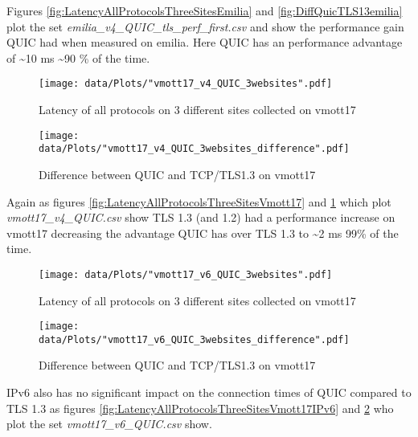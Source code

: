 Figures \ref{fig:LatencyAllProtocolsThreeSitesEmilia} and \ref{fig:DiffQuicTLS13emilia} plot the set \textit{emilia\_v4\_QUIC\_tls\_perf\_first.csv} and show the performance gain QUIC had when measured on emilia.
Here QUIC has an performance advantage of \textasciitilde 10 ms \textasciitilde 90 \% of the time.


\begin{figure}[!thb]
	\centering
	\begin{minipage}{.45\textwidth}
		\centering
		\texttt{[image: data/Plots/"vmott17\_v4\_QUIC\_3websites".pdf]}
		\caption{Latency of all protocols on 3 different sites collected on vmott17}
  		\label{fig:LatencyAllProtocolsThreeSitesVmott17}
  	\end{minipage}%
  	\hspace{0.5cm}
  	\begin{minipage}{.45\textwidth}
  		\centering
  		\texttt{[image: data/Plots/"vmott17\_v4\_QUIC\_3websites\_difference".pdf]}
		\caption{Difference between QUIC and TCP/TLS1.3 on vmott17}
  		\label{fig:DiffQuicTLS13Vmott17}
  	\end{minipage}
\end{figure}

Again as figures \ref{fig:LatencyAllProtocolsThreeSitesVmott17} and \ref{fig:DiffQuicTLS13Vmott17} which plot \textit{vmott17\_v4\_QUIC.csv} show TLS 1.3 (and 1.2) had a performance increase on vmott17 decreasing the advantage QUIC has over TLS 1.3 to \textasciitilde 2 ms 99\% of the time.

\begin{figure}[!thb]
	\centering
	\begin{minipage}{.45\textwidth}
  		\centering
		\texttt{[image: data/Plots/"vmott17\_v6\_QUIC\_3websites".pdf]}
		\caption{Latency of all protocols on 3 different sites collected on vmott17}
  		\label{fig:LatencyAllProtocolsThreeSitesVmott17IPv6}
  	\end{minipage}%
  	\hspace{0.5cm}
  	\begin{minipage}{.45\textwidth}
  		\centering
  		\texttt{[image: data/Plots/"vmott17\_v6\_QUIC\_3websites\_difference".pdf]}
		\caption{Difference between QUIC and TCP/TLS1.3 on vmott17}
  		\label{fig:DiffQuicTLS13Vmott17IPv6}
  	\end{minipage}
\end{figure}

IPv6 also has no significant impact on the connection times of QUIC compared to TLS 1.3 as figures \ref{fig:LatencyAllProtocolsThreeSitesVmott17IPv6} and \ref{fig:DiffQuicTLS13Vmott17IPv6} who plot the set \textit{vmott17\_v6\_QUIC.csv} show.